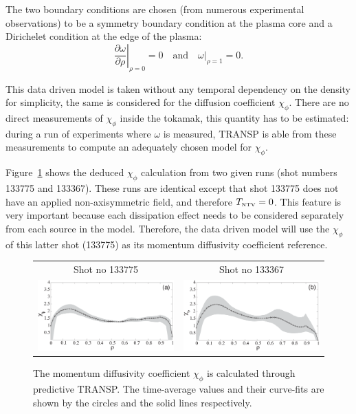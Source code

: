 \documentclass[12pt]{iopart}
\begin{document}
The two boundary conditions are chosen (from numerous experimental observations) to be a symmetry boundary condition at the plasma core and a Dirichelet condition at the edge of the plasma:
\begin{equation}
\left.\frac{\partial\omega}{\partial\rho}\right|_{\rho=0} = 0 
\quad \textrm{and} \quad 
\left.\omega\right|_{\rho=1} = 0.
\label{bc0}
\end{equation}

This data driven model is taken without any temporal dependency on the density  for simplicity, the same is considered for the diffusion coefficient $\chi_\phi$. There are no direct measurements of $\chi_\phi$ inside the tokamak, this quantity has to be estimated: during a run of experiments where $\omega$ is measured, TRANSP is able from these measurements to compute an adequately chosen model for  $\chi_\phi$. 

Figure~{\ref{fig:chiphi}} shows the deduced $\chi_\phi$ calculation from two given runs (shot numbers 133775 and 133367). These runs are identical except that shot 133775 does not have an applied non-axisymmetric field, and therefore $T_\textrm{\tiny NTV} = 0$. This feature is very important because each dissipation effect needs to be considered separately from each source in the model. Therefore, the data driven model will use the $\chi_\phi$ of this latter shot (133775) as its momentum diffusivity coefficient reference.

\begin{figure} \centering
\begin{tabular}{cc}
Shot no 133775  & Shot no 133367 \\
\includegraphics[width=0.45\linewidth]{imene_figs/CHIPHI1} &  
\includegraphics[width= 0.45\linewidth]{imene_figs/CHIPHI2} \\
\end{tabular}
\caption{The momentum diffusivity coefficient $ \chi_{\phi}$ is calculated through  predictive TRANSP. The time-average values and their curve-fits are shown by the circles  and the solid lines respectively.}
\label{fig:chiphi}
\end{figure}
\end{document}
